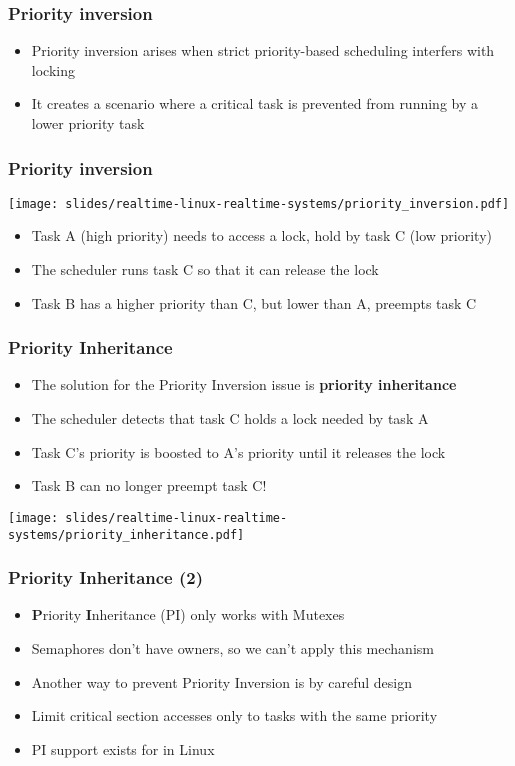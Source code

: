 \begin{frame}
  \frametitle{Priority inversion}
	\begin{itemize}
		\item Priority inversion arises when strict priority-based scheduling interfers with locking
		\item It creates a scenario where a critical task is
		      prevented from running by a lower priority task
	\end{itemize}
\end{frame}

\begin{frame}
  \frametitle{Priority inversion}
	\texttt{[image: slides/realtime-linux-realtime-systems/priority\_inversion.pdf]}
	\begin{itemize}
		\item Task A (high priority) needs to access a lock, hold by task C (low priority)
		\item The scheduler runs task C so that it can release the lock
		\item Task B has a higher priority than C, but lower than A, preempts task C
	\end{itemize}
\end{frame}

\begin{frame}
  \frametitle{Priority Inheritance}
	\begin{itemize}
		\item The solution for the Priority Inversion issue is \textbf{priority inheritance}
		\item The scheduler detects that task C holds a lock needed by task A
		\item Task C's priority is boosted to A's priority until it releases the lock
		\item Task B can no longer preempt task C!
	\end{itemize}
	\texttt{[image: slides/realtime-linux-realtime-systems/priority\_inheritance.pdf]}
\end{frame}

\begin{frame}
	\frametitle{Priority Inheritance (2)}
	\begin{itemize}
		\item \textbf{P}riority \textbf{I}nheritance (PI) only works with Mutexes
		\item Semaphores don't have owners, so we can't apply this mechanism
		\item Another way to prevent Priority Inversion is by careful design
		\item Limit critical section accesses only to tasks with the same priority
		\item PI support exists for  in Linux
	\end{itemize}
\end{frame}
